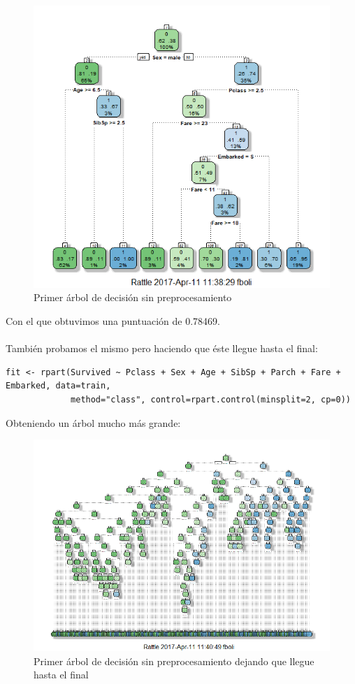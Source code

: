 \begin{figure}[H]
	\centering
	\includegraphics[width=14cm]{img/first-decision-tree}
	\caption{Primer árbol de decisión sin preprocesamiento}
	\label{fig:first-decision-tree}
\end{figure}

Con el que obtuvimos una puntuación de 0.78469.
\\ \\
También probamos el mismo pero haciendo que éste llegue hasta el final:

\begin{lstlisting}[style=R]
fit <- rpart(Survived ~ Pclass + Sex + Age + SibSp + Parch + Fare + Embarked, data=train,
             method="class", control=rpart.control(minsplit=2, cp=0))
\end{lstlisting}

Obteniendo un árbol mucho más grande:

\begin{figure}[H]
	\centering
	\includegraphics[width=14cm]{img/first-big-decision-tree}
	\caption{Primer árbol de decisión sin preprocesamiento dejando que llegue hasta el final}
	\label{fig:first-big-decision-tree}
\end{figure}

